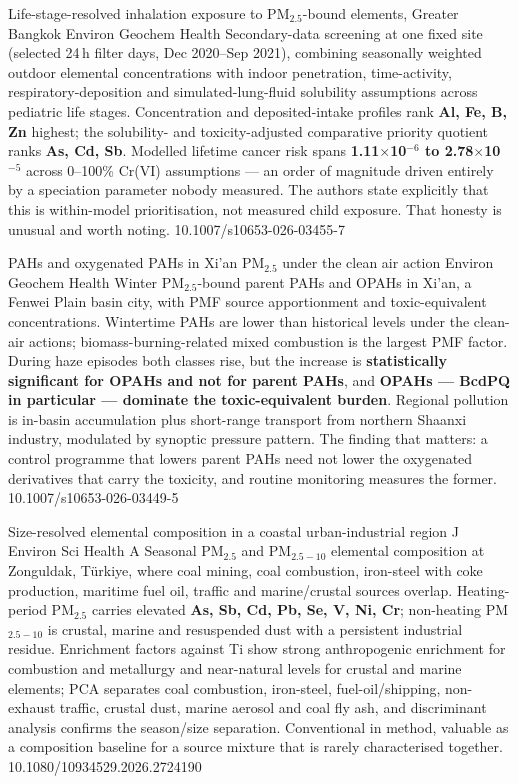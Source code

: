 \documentclass[10pt]{article}
\begin{document}
{Life-stage-resolved inhalation exposure to PM$_{2.5}$-bound elements, Greater Bangkok}
{Environ Geochem Health}
{Secondary-data screening at one fixed site (selected 24\,h filter days, Dec 2020--Sep
2021), combining seasonally weighted outdoor elemental concentrations with indoor
penetration, time-activity, respiratory-deposition and simulated-lung-fluid solubility
assumptions across pediatric life stages. Concentration and deposited-intake profiles
rank \textbf{Al, Fe, B, Zn} highest; the solubility- and toxicity-adjusted comparative
priority quotient ranks \textbf{As, Cd, Sb}. Modelled lifetime cancer risk spans
\textbf{1.11$\times$10$^{-6}$ to 2.78$\times$10$^{-5}$} across 0--100\% Cr(VI)
assumptions --- an order of magnitude driven entirely by a speciation parameter nobody
measured. The authors state explicitly that this is within-model prioritisation, not
measured child exposure. That honesty is unusual and worth noting.}
{10.1007/s10653-026-03455-7}

{PAHs and oxygenated PAHs in Xi'an PM$_{2.5}$ under the clean air action}
{Environ Geochem Health}
{Winter PM$_{2.5}$-bound parent PAHs and OPAHs in Xi'an, a Fenwei Plain basin city, with
PMF source apportionment and toxic-equivalent concentrations. Wintertime PAHs are lower
than historical levels under the clean-air actions; biomass-burning-related mixed
combustion is the largest PMF factor. During haze episodes both classes rise, but the
increase is \textbf{statistically significant for OPAHs and not for parent PAHs}, and
\textbf{OPAHs --- BcdPQ in particular --- dominate the toxic-equivalent burden}. Regional
pollution is in-basin accumulation plus short-range transport from northern Shaanxi
industry, modulated by synoptic pressure pattern. The finding that matters: a control
programme that lowers parent PAHs need not lower the oxygenated derivatives that carry
the toxicity, and routine monitoring measures the former.}
{10.1007/s10653-026-03449-5}

{Size-resolved elemental composition in a coastal urban-industrial region}
{J Environ Sci Health A}
{Seasonal PM$_{2.5}$ and PM$_{2.5-10}$ elemental composition at Zonguldak, T\"urkiye,
where coal mining, coal combustion, iron-steel with coke production, maritime fuel oil,
traffic and marine/crustal sources overlap. Heating-period PM$_{2.5}$ carries elevated
\textbf{As, Sb, Cd, Pb, Se, V, Ni, Cr}; non-heating PM$_{2.5-10}$ is crustal, marine and
resuspended dust with a persistent industrial residue. Enrichment factors against Ti show
strong anthropogenic enrichment for combustion and metallurgy and near-natural levels for
crustal and marine elements; PCA separates coal combustion, iron-steel, fuel-oil/shipping,
non-exhaust traffic, crustal dust, marine aerosol and coal fly ash, and discriminant
analysis confirms the season/size separation. Conventional in method, valuable as a
composition baseline for a source mixture that is rarely characterised together.}
{10.1080/10934529.2026.2724190}
\end{document}
